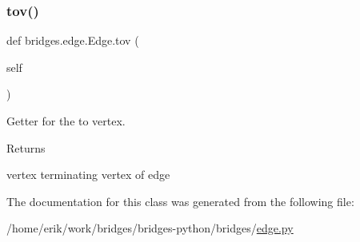 \subsubsection{\texorpdfstring{tov()}{tov()}}
{\footnotesize\ttfamily def bridges.\+edge.\+Edge.\+tov (\begin{DoxyParamCaption}\item[{}]{self }\end{DoxyParamCaption})}



Getter for the to vertex. 

\begin{DoxyReturn}{Returns}


vertex terminating vertex of edge 
\end{DoxyReturn}


The documentation for this class was generated from the following file\+:\begin{DoxyCompactItemize}
\item 
/home/erik/work/bridges/bridges-\/python/bridges/\hyperlink{edge_8py}{edge.\+py}\end{DoxyCompactItemize}
